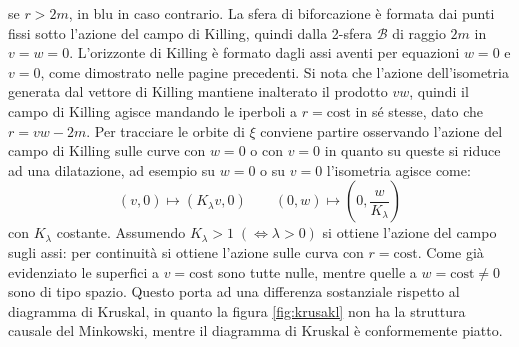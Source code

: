 \documentclass[]{scrartcl}
\newcommand{\cost}{\mathrm{cost}}
\begin{document}
se $ r > 2m $, in blu in caso contrario. La sfera di biforcazione è formata dai punti fissi sotto l'azione del campo di Killing, quindi
dalla 2-sfera $ \mathcal{B} $ di raggio $ 2m $ in $ v = w = 0 $. L'orizzonte di Killing è formato dagli assi aventi per equazioni $ w = 0 $
e $ v = 0 $, come dimostrato nelle pagine precedenti.
Si nota che l'azione dell'isometria generata dal vettore di Killing mantiene inalterato il prodotto $ vw $, quindi il campo di Killing agisce mandando
le iperboli a $ r = \cost $ in sé stesse, dato che $ r = vw - 2m $. Per tracciare le orbite di $ \xi $ conviene partire osservando l'azione del campo di Killing
sulle curve con $ w = 0 $ o con $ v = 0 $ in quanto su queste si riduce ad una dilatazione,
ad esempio su $ w = 0 $ o su $ v = 0 $ l'isometria agisce come:
\[
  (v,0) \mapsto (K_\lambda v, 0) \qquad  (0,w) \mapsto (0, \frac{w}{K_\lambda})
\]
con $ K_\lambda $ costante. Assumendo $ K_\lambda > 1 \; (\Leftrightarrow \lambda > 0) $ si ottiene l'azione del campo sugli assi: per continuità si ottiene
l'azione sulle curva con $ r = \cost $.
Come già evidenziato le superfici a $ v = \cost $ sono tutte nulle, mentre quelle a $ w = \cost \not = 0 $ sono di tipo spazio.
Questo porta ad una differenza sostanziale rispetto al diagramma di Kruskal, in quanto la figura \ref{fig:krusakl} non ha la struttura causale del Minkowski,
mentre il diagramma di Kruskal è conformemente piatto.

\end{document}
